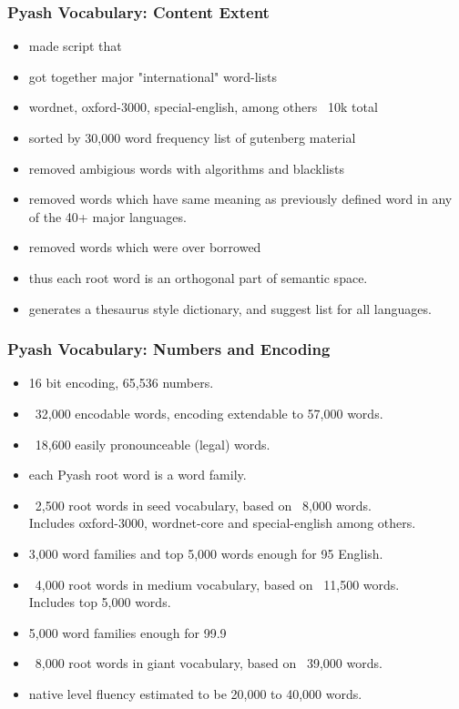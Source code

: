 \documentclass{beamer}
\begin{document}
\begin{frame}
  \frametitle{Pyash Vocabulary: Content Extent}
  \begin{itemize}
    \item made script that
    \item got together major "international" word-lists
    \item wordnet, oxford-3000, special-english, among others ~10k total
    \item sorted by 30,000 word frequency list of gutenberg material
    \item removed ambigious words with algorithms and blacklists
    \item removed words which have same meaning as previously defined word in
          any of the 40+ major languages.
    \item removed words which were over borrowed
    \item thus each root word is an orthogonal part of semantic space.
    \item generates a thesaurus style dictionary, and suggest list for all
          languages.
  \end{itemize}
\end{frame}

\begin{frame}
  \frametitle{Pyash Vocabulary: Numbers and Encoding}
  \begin{itemize}
    \item 16 bit encoding, 65,536 numbers.
    \item ~32,000 encodable words, encoding extendable to 57,000 words.
    \item ~18,600 easily pronounceable (legal) words.
    \item each Pyash root word is a word family.
    \item ~2,500 root words in seed vocabulary, based on ~8,000 words. \\
          Includes oxford-3000, wordnet-core and special-english among others. 
    \item 3,000 word families and top 5,000 words enough for 95%
          English.
    \item ~4,000 root words in medium vocabulary, based on ~11,500 words. \\
          Includes top 5,000 words.
    \item 5,000 word families enough for 99.9%
    \item ~8,000 root words in giant vocabulary, based on ~39,000 words. 
    \item native level fluency estimated to be 20,000 to 40,000 words. 
  \end{itemize}
\end{frame}
\end{document}
